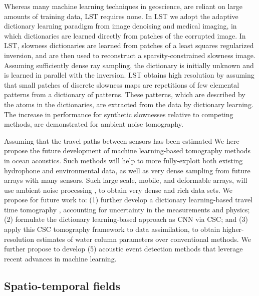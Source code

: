 \documentclass{article}
\begin{document}
Whereas many machine learning techniques in geoscience\cite{kong2018}, are reliant on large amounts of training data, LST requires none. In LST we adopt the adaptive dictionary learning paradigm from image denoising \cite{elad2010} and medical imaging\cite{ravishankar2011}, in which dictionaries are learned directly from patches of the corrupted image. In LST, slowness dictionaries are learned from patches of a least squares regularized inversion, and are then used to reconstruct a sparsity-constrained slowness image. Assuming sufficiently dense ray sampling, the dictionary is initially unknown and is learned in parallel with the inversion. LST obtains high resolution by assuming that small patches of discrete slowness maps are repetitions of few elemental patterns from a dictionary of patterns. These patterns, which are described by the atoms in the dictionaries, are extracted from the data by dictionary learning. The increase in performance for synthetic slownesses relative to competing methods, are demonstrated for  ambient noise tomography\cite{bianco2018}. 

Assuming that the travel paths between sensors has been estimated\cite{sabra2005,gerstoft2006} We here propose the future development of machine learning-based tomography methods in ocean acoustics. Such methods will help to more fully-exploit both existing hydrophone and environmental data, as well as very dense sampling from future arrays with many sensors. Such large scale, mobile, and deformable arrays, will use ambient noise processing \cite{sabra2005}, to obtain very dense and rich data sets. We propose for future work to: (1) further develop a dictionary learning-based travel time tomography \cite{bianco2018}, accounting for uncertainty in the measurements and physics; (2) formulate the dictionary learning-based approach as CNN via CSC; and (3) apply this CSC tomography framework to  data assimilation, to obtain higher-resolution estimates of water column parameters over conventional methods. We further propose to develop  (5) acoustic event detection methods that leverage recent advances in machine learning.


\subsection{Spatio-temporal fields}
\end{document}

